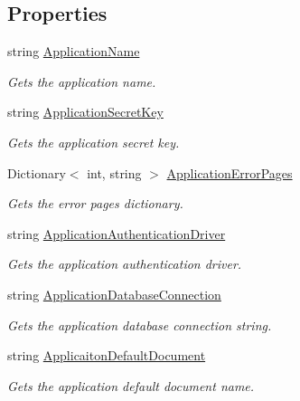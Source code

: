 \subsection*{Properties}
\begin{DoxyCompactItemize}
\item 
string \hyperlink{class_mvc_1_1_configuration_manager_a29c7dc729909b9ad5e1a9e8ede9a3884}{Application\+Name}
\begin{DoxyCompactList}\small\item\em Gets the application name. \end{DoxyCompactList}\item 
string \hyperlink{class_mvc_1_1_configuration_manager_a208b34447455d80d11bfe95905b90c7c}{Application\+Secret\+Key}
\begin{DoxyCompactList}\small\item\em Gets the application secret key. \end{DoxyCompactList}\item 
Dictionary$<$ int, string $>$ \hyperlink{class_mvc_1_1_configuration_manager_aae59944b7a43dba20df4658860c5c1c4}{Application\+Error\+Pages}
\begin{DoxyCompactList}\small\item\em Gets the error pages dictionary. \end{DoxyCompactList}\item 
string \hyperlink{class_mvc_1_1_configuration_manager_a0cb7f0a9c20b0f5f67e9bdac41496172}{Application\+Authentication\+Driver}
\begin{DoxyCompactList}\small\item\em Gets the application authentication driver. \end{DoxyCompactList}\item 
string \hyperlink{class_mvc_1_1_configuration_manager_a318a7ee1d3119f9bc651adfbd512e627}{Application\+Database\+Connection}
\begin{DoxyCompactList}\small\item\em Gets the application database connection string. \end{DoxyCompactList}\item 
string \hyperlink{class_mvc_1_1_configuration_manager_a2384d0345e8093089dfff959c07e562e}{Applicaiton\+Default\+Document}
\begin{DoxyCompactList}\small\item\em Gets the application default document name. \end{DoxyCompactList}\end{DoxyCompactItemize}


